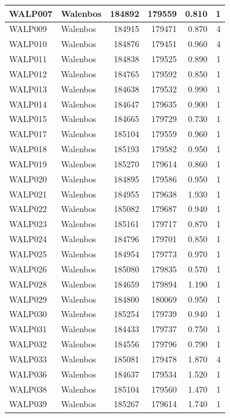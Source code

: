 \documentclass[11pt,]{book}
\begin{document}
\begin{table}
\begin{tabular}[t]{l|l|r|r|r|r}
\hline
WALP007 & Walenbos & 184892 & 179559 & 0.810 & 1\\
\hline
WALP009 & Walenbos & 184915 & 179471 & 0.870 & 4\\
\hline
WALP010 & Walenbos & 184876 & 179451 & 0.960 & 4\\
\hline
WALP011 & Walenbos & 184838 & 179525 & 0.890 & 1\\
\hline
WALP012 & Walenbos & 184765 & 179592 & 0.850 & 1\\
\hline
WALP013 & Walenbos & 184638 & 179532 & 0.990 & 1\\
\hline
WALP014 & Walenbos & 184647 & 179635 & 0.900 & 1\\
\hline
WALP015 & Walenbos & 184665 & 179729 & 0.730 & 1\\
\hline
WALP017 & Walenbos & 185104 & 179559 & 0.960 & 1\\
\hline
WALP018 & Walenbos & 185193 & 179582 & 0.950 & 1\\
\hline
WALP019 & Walenbos & 185270 & 179614 & 0.860 & 1\\
\hline
WALP020 & Walenbos & 184895 & 179586 & 0.950 & 1\\
\hline
WALP021 & Walenbos & 184955 & 179638 & 1.930 & 1\\
\hline
WALP022 & Walenbos & 185082 & 179687 & 0.940 & 1\\
\hline
WALP023 & Walenbos & 185161 & 179717 & 0.870 & 1\\
\hline
WALP024 & Walenbos & 184796 & 179701 & 0.850 & 1\\
\hline
WALP025 & Walenbos & 184954 & 179773 & 0.970 & 1\\
\hline
WALP026 & Walenbos & 185080 & 179835 & 0.570 & 1\\
\hline
WALP028 & Walenbos & 184659 & 179894 & 1.190 & 1\\
\hline
WALP029 & Walenbos & 184800 & 180069 & 0.950 & 1\\
\hline
WALP030 & Walenbos & 185254 & 179739 & 0.940 & 1\\
\hline
WALP031 & Walenbos & 184433 & 179737 & 0.750 & 1\\
\hline
WALP032 & Walenbos & 184556 & 179796 & 0.790 & 1\\
\hline
WALP033 & Walenbos & 185081 & 179478 & 1.870 & 4\\
\hline
WALP036 & Walenbos & 184637 & 179534 & 1.520 & 1\\
\hline
WALP038 & Walenbos & 185104 & 179560 & 1.470 & 1\\
\hline
WALP039 & Walenbos & 185267 & 179614 & 1.740 & 1\\

\end{tabular}
\end{table}
\end{document}
